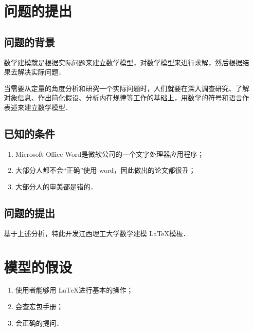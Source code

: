 \documentclass{JXUSTmodeling}
\begin{document}
    \thispagestyle{empty}\listofexamples\newpage
    \section{问题的提出}\label{sec:1}
    \subsection{问题的背景}\label{sub:1.1}
    数学建模就是根据实际问题来建立数学模型，对数学模型来进行求解，然后根据结果去解决实际问题．

    当需要从定量的角度分析和研究一个实际问题时，人们就要在深入调查研究、了解对象信息、作出简化假设、分析内在规律等工作的基础上，用数学的符号和语言作表述来建立数学模型．

    \subsection{已知的条件}\label{sub:1.2}
    \begin{enumerate}
        \item Microsoft Office Word是微软公司的一个文字处理器应用程序；
        \item 大部分人都不会“正确”使用 word，因此做出的论文都很丑；
        \item 大部分人的审美都是错的．
    \end{enumerate}

    \subsection{问题的提出}\label{sub:1.3}
    基于上述分析，特此开发江西理工大学数学建模 \LaTeX{}模板．

    \section{模型的假设}\label{sec:2}
    \begin{enumerate}
        \item 使用者能够用 \LaTeX{}进行基本的操作；
        \item 会查宏包手册；
        \item 会正确的提问．
    \end{enumerate}
\end{document}
